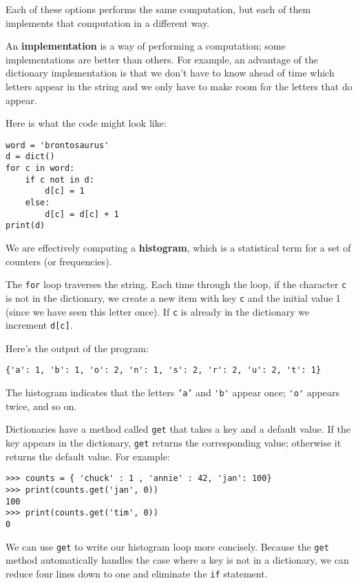 Each of these options performs the same computation, but each
of them implements that computation in a different way.


An {\bf implementation} is a way of performing a computation;
some implementations are better than others.  For example,
an advantage of the dictionary implementation is that we don't
have to know ahead of time which letters appear in the string
and we only have to make room for the letters that do appear.

Here is what the code might look like:

\beforeverb
\begin{verbatim}
word = 'brontosaurus'
d = dict()
for c in word:
    if c not in d:
        d[c] = 1
    else:
        d[c] = d[c] + 1
print(d)
\end{verbatim}
\afterverb
%
We are effectively computing a {\bf histogram}, which is a statistical
term for a set of counters (or frequencies).  


The {\tt for} loop traverses
the string.  Each time through the loop, if the character {\tt c} is
not in the dictionary, we create a new item with key {\tt c} and the
initial value 1 (since we have seen this letter once).  If {\tt c} is
already in the dictionary we increment {\tt d[c]}.


Here's the output of the program:

\beforeverb
\begin{verbatim}
{'a': 1, 'b': 1, 'o': 2, 'n': 1, 's': 2, 'r': 2, 'u': 2, 't': 1}
\end{verbatim}
\afterverb
%
The histogram indicates that the letters {\tt 'a'} and \verb"'b'"
appear once; \verb"'o'" appears twice, and so on.


Dictionaries have a method called {\tt get} that takes a key
and a default value.  If the key appears in the dictionary,
{\tt get} returns the corresponding value; otherwise it returns
the default value.  For example:

\beforeverb
\begin{verbatim}
>>> counts = { 'chuck' : 1 , 'annie' : 42, 'jan': 100}
>>> print(counts.get('jan', 0))
100
>>> print(counts.get('tim', 0))
0
\end{verbatim}
\afterverb
%
We can use {\tt get} to write our histogram loop more concisely.  
Because the {\tt get} method automatically handles the case where a key
is not in a dictionary, we can reduce four lines down to one
and eliminate the {\tt if} statement.

